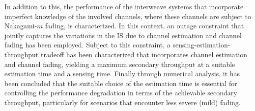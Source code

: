 {In addition to this, the performance of the interweave systems that incorporate imperfect knowledge of the involved channels, where these channels are subject to Nakagami-$m$ fading, is characterized. In this context, an outage constraint that jointly captures the variations in the IS due to channel estimation and channel fading has been employed. Subject to this constraint, a sensing-estimation-throughput tradeoff has been characterized that incorporates channel estimation and channel fading, yielding a maximum secondary throughput at a suitable estimation time and a sensing time. Finally through numerical analysis, it has been concluded that the suitable choice of the estimation time is essential for controlling the performance degradation in terms of the achievable secondary throughput, particularly for scenarios that encounter less severe (mild) fading.

}
